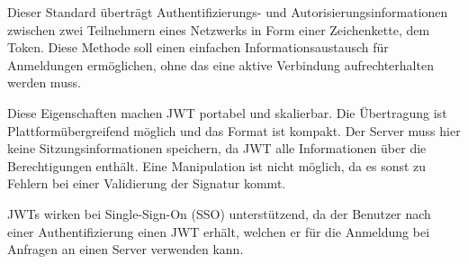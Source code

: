 Dieser Standard überträgt Authentifizierungs- und Autorisierungsinformationen zwischen zwei Teilnehmern eines Netzwerks in Form einer Zeichenkette, dem Token. Diese Methode soll einen einfachen Informationsaustausch für Anmeldungen ermöglichen, ohne das eine aktive Verbindung aufrechterhalten werden muss.

Diese Eigenschaften machen JWT portabel und skalierbar. Die Übertragung ist Plattformübergreifend möglich und das Format ist kompakt. Der Server muss hier keine Sitzungsinformationen speichern, da JWT alle Informationen über die Berechtigungen enthält. Eine Manipulation ist nicht möglich, da es sonst zu Fehlern bei einer Validierung der Signatur kommt.\cite{ionos-jwt}

JWTs wirken bei Single-Sign-On (SSO) unterstützend, da der Benutzer nach einer Authentifizierung einen JWT erhält, welchen er für die Anmeldung bei Anfragen an einen Server verwenden kann.